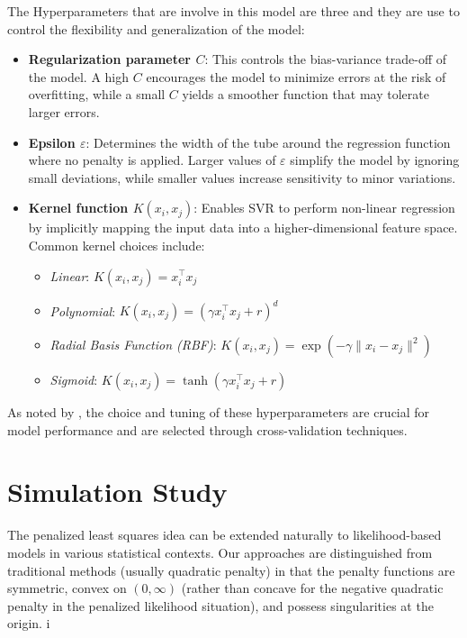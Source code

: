\documentclass[8pt,twocolumn]{article}
\begin{document}
The Hyperparameters that are involve in this model are three and they are use to control the flexibility and generalization of the model:

\begin{itemize}
    \item \textbf{Regularization parameter $C$}: This controls the bias-variance trade-off of the model. A high $C$ encourages the model to minimize errors at the risk of overfitting, while a small $C$ yields a smoother function that may tolerate larger errors.
    \item \textbf{Epsilon $\varepsilon$}: Determines the width of the tube around the regression function where no penalty is applied. Larger values of $\varepsilon$ simplify the model by ignoring small deviations, while smaller values increase sensitivity to minor variations.
    \item \textbf{Kernel function $K(x_i, x_j)$}: Enables SVR to perform non-linear regression by implicitly mapping the input data into a higher-dimensional feature space. Common kernel choices include:
    \begin{itemize}
        \item \textit{Linear}: $K(x_i, x_j) = x_i^\top x_j$
        \item \textit{Polynomial}: $K(x_i, x_j) = (\gamma x_i^\top x_j + r)^d$
        \item \textit{Radial Basis Function (RBF)}: $K(x_i, x_j) = \exp(-\gamma \|x_i - x_j\|^2)$
        \item \textit{Sigmoid}: $K(x_i, x_j) = \tanh(\gamma x_i^\top x_j + r)$
    \end{itemize}
\end{itemize}

As noted by \citet{hastie2009elements}, the choice and tuning of these hyperparameters are crucial for model performance and are selected through cross-validation techniques.


\section{Simulation Study}

The penalized least squares idea can be extended naturally to likelihood-based models in various statistical contexts. Our approaches are distinguished from traditional methods (usually quadratic penalty) in that the penalty functions are symmetric, convex on $(0, \infty)$ (rather than concave for the negative quadratic penalty in the penalized likelihood situation), and possess singularities at the origin.
i
\end{document}
